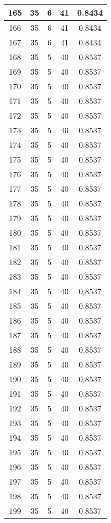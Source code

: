\documentclass[letterpaper, 12pt]{article}
\begin{document}
\begin{longtable}{|c|c|c|c|c|}
\hline
165 & 35 & 6 & 41 & 0.8434 \\
\hline
166 & 35 & 6 & 41 & 0.8434 \\
\hline
167 & 35 & 6 & 41 & 0.8434 \\
\hline
168 & 35 & 5 & 40 & 0.8537 \\
\hline
169 & 35 & 5 & 40 & 0.8537 \\
\hline
170 & 35 & 5 & 40 & 0.8537 \\
\hline
171 & 35 & 5 & 40 & 0.8537 \\
\hline
172 & 35 & 5 & 40 & 0.8537 \\
\hline
173 & 35 & 5 & 40 & 0.8537 \\
\hline
174 & 35 & 5 & 40 & 0.8537 \\
\hline
175 & 35 & 5 & 40 & 0.8537 \\
\hline
176 & 35 & 5 & 40 & 0.8537 \\
\hline
177 & 35 & 5 & 40 & 0.8537 \\
\hline
178 & 35 & 5 & 40 & 0.8537 \\
\hline
179 & 35 & 5 & 40 & 0.8537 \\
\hline
180 & 35 & 5 & 40 & 0.8537 \\
\hline
181 & 35 & 5 & 40 & 0.8537 \\
\hline
182 & 35 & 5 & 40 & 0.8537 \\
\hline
183 & 35 & 5 & 40 & 0.8537 \\
\hline
184 & 35 & 5 & 40 & 0.8537 \\
\hline
185 & 35 & 5 & 40 & 0.8537 \\
\hline
186 & 35 & 5 & 40 & 0.8537 \\
\hline
187 & 35 & 5 & 40 & 0.8537 \\
\hline
188 & 35 & 5 & 40 & 0.8537 \\
\hline
189 & 35 & 5 & 40 & 0.8537 \\
\hline
190 & 35 & 5 & 40 & 0.8537 \\
\hline
191 & 35 & 5 & 40 & 0.8537 \\
\hline
192 & 35 & 5 & 40 & 0.8537 \\
\hline
193 & 35 & 5 & 40 & 0.8537 \\
\hline
194 & 35 & 5 & 40 & 0.8537 \\
\hline
195 & 35 & 5 & 40 & 0.8537 \\
\hline
196 & 35 & 5 & 40 & 0.8537 \\
\hline
197 & 35 & 5 & 40 & 0.8537 \\
\hline
198 & 35 & 5 & 40 & 0.8537 \\
\hline
199 & 35 & 5 & 40 & 0.8537 \\
\hline
\end{longtable}
\end{document}

